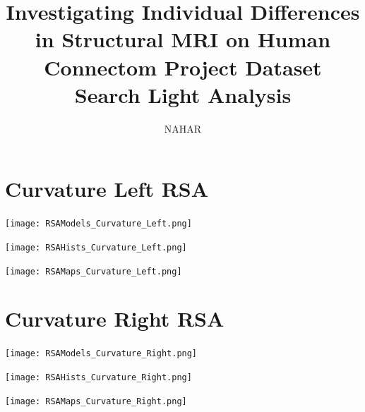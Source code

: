 \documentclass[]{article}
\title{Investigating Individual Differences in Structural MRI on Human Connectom Project Dataset\\ Search Light Analysis }
\author{NAHAR}
\begin{document}
\maketitle
\thispagestyle{empty}

\newpage

\section{ Curvature Left RSA}
\centerline{\texttt{[image: RSAModels\_Curvature\_Left.png]}}
\centerline{\texttt{[image: RSAHists\_Curvature\_Left.png]}}
\centerline{\texttt{[image: RSAMaps\_Curvature\_Left.png]}}
\newpage
\vspace*{-3cm}
\section{Curvature Right RSA}
\centerline{\texttt{[image: RSAModels\_Curvature\_Right.png]}}
\centerline{\texttt{[image: RSAHists\_Curvature\_Right.png]}}
\centerline{\texttt{[image: RSAMaps\_Curvature\_Right.png]}}

\newpage
\vspace*{-3cm}
\end{document}
